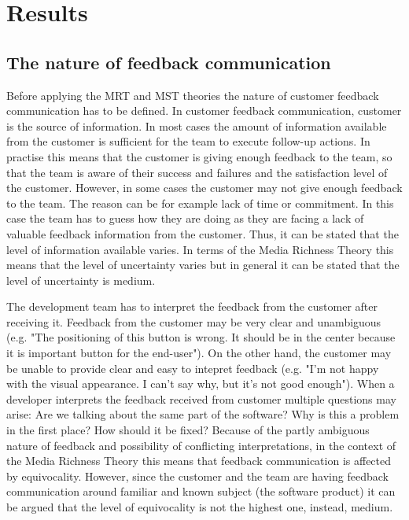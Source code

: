 \documentclass[conference]{IEEEtran}
\begin{document}
\section{Results}

\subsection{The nature of feedback communication}

Before applying the MRT and MST theories the nature of customer feedback communication has to be defined. In customer feedback communication, customer is the source of information. In most cases the amount of information available from the customer is sufficient for the team to execute follow-up actions. In practise this means that the customer is giving enough feedback to the team, so that the team is aware of their success and failures and the satisfaction level of the customer. However, in some cases the customer may not give enough feedback to the team. The reason can be for example lack of time or commitment. In this case the team has to guess how they are doing as they are facing a lack of valuable feedback information from the customer. Thus, it can be stated that the level of information available varies. In terms of the Media Richness Theory this means that the level of uncertainty varies but in general it can be stated that the level of uncertainty is medium. 

The development team has to interpret the feedback from the customer after receiving it. Feedback from the customer may be very clear and unambiguous (e.g. "The positioning of this button is wrong. It should be in the center because it is important button for the end-user"). On the other hand, the customer may be unable to provide clear and easy to intepret feedback (e.g. "I'm not happy with the visual appearance. I can't say why, but it's not good enough"). When a developer interprets the feedback received from customer multiple questions may arise: Are we talking about the same part of the software? Why is this a problem in the first place? How should it be fixed? Because of the partly ambiguous nature of feedback and possibility of conflicting interpretations, in the context of the Media Richness Theory this means that feedback communication is affected by equivocality. However, since the customer and the team are having feedback communication around familiar and known subject (the software product) it can be argued that the level of equivocality is not the highest one, instead, medium.
\end{document}
